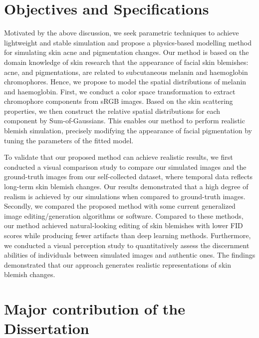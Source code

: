 \begin{spacing}{1.5}
\section{Objectives and Specifications}

Motivated by the above discussion, we seek parametric techniques to achieve lightweight and stable simulation and propose a physics-based modelling method for simulating skin acne and pigmentation changes. Our method is based on the domain knowledge of skin research that the appearance of facial skin blemishes: acne, and pigmentations, are related to subcutaneous melanin and haemoglobin chromophores. Hence, we propose to model the spatial distributions of melanin and haemoglobin. First, we conduct a color space transformation to extract chromophore components from sRGB images. Based on the skin scattering properties, we then construct the relative spatial distributions for each component by Sum-of-Gaussians. This enables our method to perform realistic blemish simulation, precisely modifying the appearance of facial pigmentation by tuning the parameters of the fitted model.

To validate that our proposed method can achieve realistic results, we first conducted a visual comparison study to compare our simulated images and the ground-truth images from our self-collected dataset, where temporal data reflects long-term skin blemish changes. Our results demonstrated that a high degree of realism is achieved by our simulations when compared to ground-truth images. Secondly, we compared the proposed method with some current generalized image editing/generation algorithms or software. Compared to these methods, our method achieved natural-looking editing of skin blemishes with lower FID scores while producing fewer artifacts than deep learning methods. Furthermore, we conducted a visual perception study to quantitatively assess the discernment abilities of individuals between simulated images and authentic ones. The findings demonstrated that our approach generates realistic representations of skin blemish changes.


\section{Major contribution of the Dissertation}


\end{spacing}
